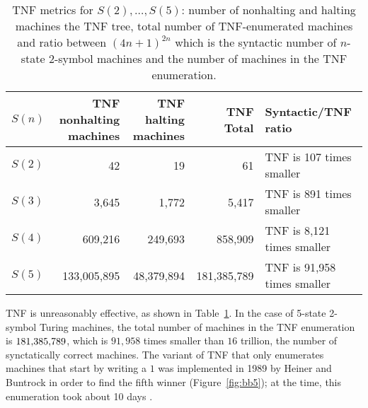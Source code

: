 \begin{table}[h!]
    \centering
    \begin{tabular}{|l|r|r|r|l|}
        \hline
        $S(n)$ & \makecell{TNF nonhalting                                                          \\ machines} & \makecell{TNF halting \\ machines} & TNF Total         & Syntactic/TNF ratio                 \\
        \hline
        $S(2)$ & 42                       & 19         & 61          & TNF is 107 times smaller    \\
        $S(3)$ & 3,645                    & 1,772      & 5,417       & TNF is 891 times smaller    \\
        $S(4)$ & 609,216                  & 249,693    & 858,909     & TNF is 8,121 times smaller  \\
        $S(5)$ & 133,005,895              & 48,379,894 & 181,385,789 & TNF is 91,958 times smaller \\
        \hline
    \end{tabular}

    \caption{TNF metrics for $S(2),\dots,S(5)$: number of nonhalting and halting machines the TNF tree, total number of TNF-enumerated machines and ratio between $(4n+1)^{2n}$ which is the syntactic number of $n$-state 2-symbol machines and the number of machines in the TNF enumeration.}\label{tab:TNF-numbers}
\end{table}

TNF is unreasonably effective, as shown in Table~\ref{tab:TNF-numbers}. In the case of 5-state 2-symbol Turing machines, the total number of machines in the TNF enumeration is $181{,}385{,}789$, which is $91{,}958$ times smaller than $16$ trillion, the number of synctatically correct machines. The variant of TNF that only enumerates machines that start by writing a $1$ was implemented in 1989 by Heiner and Buntrock in order to find the fifth \BBfull winner (Figure~\ref{fig:bb5}); at the time, this enumeration took about 10 days \cite{Marxen_1990}.

